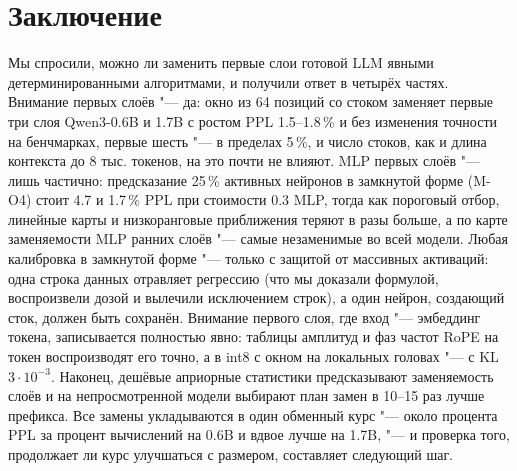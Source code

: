 \section{Заключение}
Мы спросили, можно ли заменить первые слои готовой LLM явными
детерминированными алгоритмами, и получили ответ в четырёх частях.
Внимание первых слоёв "--- да: окно из 64 позиций со стоком заменяет
первые три слоя Qwen3-0.6B и 1.7B с ростом PPL 1.5--1.8\,\% и без изменения
точности на бенчмарках, первые шесть "--- в пределах 5\,\%, и число стоков,
как и длина контекста до 8 тыс. токенов, на это почти не влияют. MLP
первых слоёв "--- лишь частично: предсказание 25\,\% активных нейронов в
замкнутой форме (M-O4) стоит 4.7 и 1.7\,\% PPL при стоимости $0.3$ MLP,
тогда как пороговый отбор, линейные карты и низкоранговые приближения
теряют в разы больше, а по карте заменяемости MLP ранних слоёв "--- самые
незаменимые во всей модели. Любая калибровка в замкнутой форме "--- только
с защитой от массивных активаций: одна строка данных отравляет регрессию
(что мы доказали формулой, воспроизвели дозой и вылечили исключением
строк), а один нейрон, создающий сток, должен быть сохранён. Внимание
первого слоя, где вход "--- эмбеддинг токена, записывается полностью явно:
таблицы амплитуд и фаз частот RoPE на токен воспроизводят его точно, а в int8
с окном на локальных головах "--- с KL $3\cdot10^{-3}$. Наконец,
дешёвые априорные статистики предсказывают заменяемость слоёв и на
непросмотренной модели выбирают план замен в 10--15 раз лучше префикса.
Все замены укладываются в один обменный курс "--- около процента PPL за
процент вычислений на 0.6B и вдвое лучше на 1.7B, "--- и проверка того,
продолжает ли курс улучшаться с размером, составляет следующий шаг.
